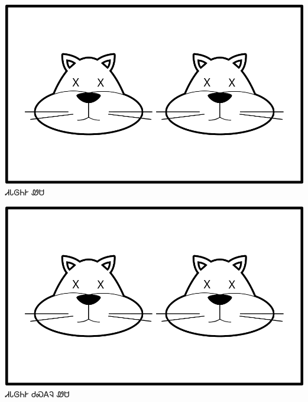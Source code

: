 \documentclass[avery5371]{flashcards}%
\begin{document}
\begin{flashcard}{
\includegraphics[width=0.95\columnwidth,height=.51\columnwidth,keepaspectratio]{../artwork/for-colors/wesa-tali-dead}
}
\Huge ᏗᏓᎶᏂᎨ ᏪᏌ
\end{flashcard}
\begin{flashcard}{
\includegraphics[width=0.95\columnwidth,height=.51\columnwidth,keepaspectratio]{../artwork/for-colors/wesa-tali-dead}
}
\Huge ᏗᏓᎶᏂᎨ ᏧᏍᎪᎸ ᏪᏌ
\end{flashcard}
\end{document}
